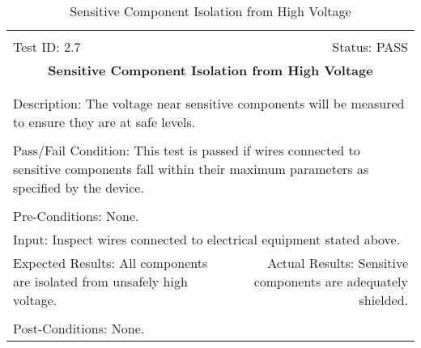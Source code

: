 \documentclass[titlepage]{article}
\begin{document}
\begin{center}
\begin{table}[h!]
\begin{tabular}{|l r|}\hline&\\[-2mm]
	Test ID: 2.7	&Status: PASS\\[-3mm]
	\multicolumn{2}{|c|}{\textbf{\large{Sensitive Component Isolation from High Voltage}}}\\&\\\hline&\\[-3mm]
	\multicolumn{2}{|p{\textwidth}|}{Description: The voltage near sensitive components will be measured to ensure they are at safe levels.}\\[1mm]\hline&\\[-3mm]
	\multicolumn{2}{|p{\textwidth}|}{Pass/Fail Condition: This test is passed if wires connected to sensitive components fall within their maximum parameters as specified by the device.}\\[1mm]\hline&\\[-3mm]
	\multicolumn{2}{|p{\textwidth}|}{Pre-Conditions: None.}\\[4mm]
	\multicolumn{2}{|p{\textwidth}|}{Input: Inspect wires connected to electrical equipment stated above.}\\[2mm]\hline
	\multicolumn{1}{|p{0.49\textwidth}}{Expected Results: All components are isolated from unsafely high voltage.}	&\multicolumn{1}{|p{0.45\textwidth}|}{Actual Results: Sensitive components are adequately shielded.}\\\hline&\\[-3mm]
	\multicolumn{2}{|p{\textwidth}|}{Post-Conditions: None.}\\\hline
\end{tabular}
\caption{Sensitive Component Isolation from High Voltage}
\end{table}
\end{center}
\end{document}
